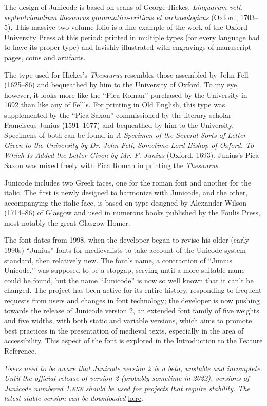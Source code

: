 \documentclass[12pt,letterpaper,openany]{book}
\newcounter{Feature}
\begin{document}
{\large%
\noindent The design of Junicode is based on scans of George Hickes,
{\itshape Linguarum vett. septentrionalium thesaurus
grammatico-criticus et archaeologicus} (Oxford, 1703–5). This massive two-volume folio is a fine
example of the work of the Oxford University Press at this
period: printed in multiple types (for every language had to
have its proper type) and lavishly
illustrated with engravings of manuscript pages, coins and
artifacts.

The type used for Hickes’s {\itshape Thesaurus} resembles those assembled
by John Fell (1625–86) and bequeathed by him to the University of
Oxford. To my eye, however, it looks more like the “Pica Roman”
purchased by the University in 1692 than like any of Fell’s. For printing in Old English, this type was
supplemented by the “Pica Saxon” commissioned by the literary scholar
Franciscus Junius (1591–1677) and bequeathed by him to
the University. Specimens of both can be found in {\itshape A Specimen of the
Several Sorts of Letter Given to the University by Dr. John Fell,
Sometime Lord Bishop of Oxford. To Which Is Added the Letter Given by
Mr. F. Junius} (Oxford, 1693). Junius’s Pica Saxon
was mixed freely with Pica Roman in printing the {\itshape Thesaurus}.

Junicode includes two Greek faces, one for the roman font and another
for the italic. The first is newly designed to harmonize with Junicode,
and the other, accompanying the italic face, is based on type designed by Alexander
Wilson (1714–86) of Glasgow and used in numerous books published by
the Foulis Press, most notably the great Glasgow Homer.

The font dates from 1998, when the developer began to revise his
older (early 1990s) “Junius” fonts for medievalists to take account of the Unicode
system standard, then relatively new. The font’s name, a contraction of
“Junius Unicode,” was supposed to be a stopgap, serving until a more suitable name
could be found, but the name “Junicode” is now so well known that it can’t be
changed. The project has been active for its entire history, responding to
frequent
requests from users and changes in font technology; the developer is now pushing
towards the release of Junicode version 2, an extended font family of five weights
and five widths, with both static and variable versions, which aims to
promote best practices in the presentation of medieval texts, especially in
the area of accessibility. This aspect of the font is explored in the
Introduction to the Feature Reference.

\textit{Users need to be aware that Junicode version 2 is a beta, unstable and
incomplete. Until the official release of version 2 (probably sometime in 2022), versions of Junicode
numbered \textsc{1.nnn} should be used for projects that require
stability. The latest stable version can be downloaded} \href{https://github.com/psb1558/Junicode-font/releases}{here}.

}
\pagestyle{fancy}
\end{document}
